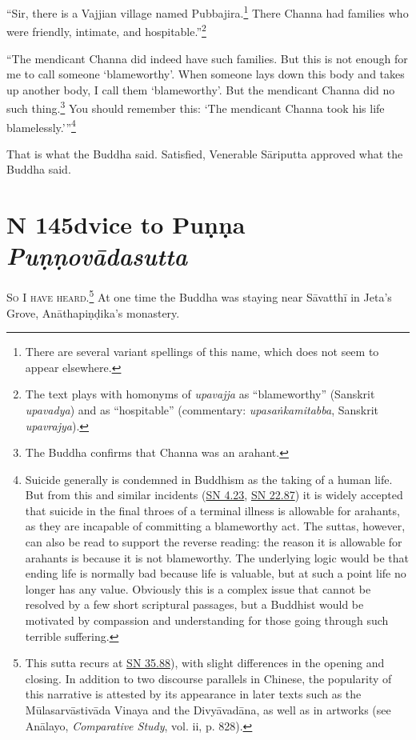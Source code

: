 \documentclass[12pt,openany]{book}%
\newcommand*{\suttatitleacronym}[1]{\smaller[2]{#1}\vspace*{.3em}}
\newcommand*{\suttatitletranslation}[1]{\linebreak{#1}}
\newcommand*{\suttatitleroot}[1]{\linebreak\smaller[2]\itshape{#1}}
\newcommand*{\tocacronym}[1]{\hspace*{-3.3em}{#1}\quad}
\newcommand*{\toctranslation}[1]{#1}
\newcommand*{\tocroot}[1]{(\textit{#1})}
\newcommand*{\scevam}[1]{\textsc{#1}}
\begin{document}
“Sir, there is a Vajjian village named Pubbajira.\footnote{There are several variant spellings of this name, which does not seem to appear elsewhere. } There Channa had families who were friendly, intimate, and hospitable.”\footnote{The text plays with homonyms of \textit{upavajja} as “blameworthy” (Sanskrit \textit{upavadya}) and as “hospitable” (commentary: \textit{\textsanskrit{upasaṅkamitabba}}, Sanskrit \textit{upavrajya}). } 

“The mendicant Channa did indeed have such families. But this is not enough for me to call someone ‘blameworthy’. When someone lays down this body and takes up another body, I call them ‘blameworthy’. But the mendicant Channa did no such thing.\footnote{The Buddha confirms that Channa was an arahant. } You should remember this: ‘The mendicant Channa took his life blamelessly.’”\footnote{Suicide generally is condemned in Buddhism as the taking of a human life. But from this and similar incidents (\href{https://suttacentral.net/sn4.23/en/sujato}{SN 4.23}, \href{https://suttacentral.net/sn22.87/en/sujato}{SN 22.87}) it is widely accepted that suicide in the final throes of a terminal illness is allowable for arahants, as they are incapable of committing a blameworthy act. The suttas, however, can also be read to support the reverse reading: the reason it is allowable for arahants is because it is not blameworthy. The underlying logic would be that ending life is normally bad because life is valuable, but at such a point life no longer has any value. Obviously this is a complex issue that cannot be resolved by a few short scriptural passages, but a Buddhist would be motivated by compassion and understanding for those going through such terrible suffering. } 

That is what the Buddha said. Satisfied, Venerable \textsanskrit{Sāriputta} approved what the Buddha said. 

%
\section*{{\suttatitleacronym MN 145}{\suttatitletranslation Advice to Puṇṇa }{\suttatitleroot Puṇṇovādasutta}}
\addcontentsline{toc}{section}{\tocacronym{MN 145} \toctranslation{Advice to Puṇṇa } \tocroot{Puṇṇovādasutta}}

\scevam{So I have heard.\footnote{This sutta recurs at \href{https://suttacentral.net/sn35.88/en/sujato}{SN 35.88}), with slight differences in the opening and closing. In addition to two discourse parallels in Chinese, the popularity of this narrative is attested by its appearance in later texts such as the \textsanskrit{Mūlasarvāstivāda} Vinaya and the \textsanskrit{Divyāvadāna}, as well as in artworks (see \textsanskrit{Anālayo}, \emph{Comparative Study}, vol. ii, p. 828). } }At one time the Buddha was staying near \textsanskrit{Sāvatthī} in Jeta’s Grove, \textsanskrit{Anāthapiṇḍika}’s monastery. 
\end{document}
